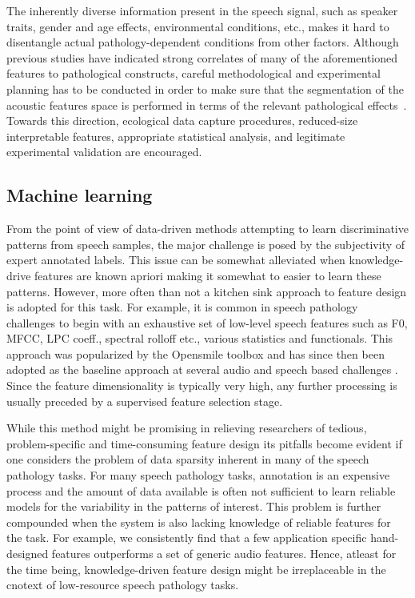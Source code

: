 \documentclass{article}
\begin{document}
The inherently diverse information present in the speech signal, such as speaker traits, gender and age effects, environmental conditions, etc., makes it hard to disentangle actual pathology-dependent conditions from other factors. Although previous studies have indicated strong correlates of many of the aforementioned features to pathological constructs, careful methodological and experimental planning has to be conducted in order to make sure that the segmentation of the acoustic features space is performed in terms of the relevant pathological effects~\cite{bone2013classifying}. Towards this direction, ecological data capture procedures, reduced-size interpretable features, appropriate statistical analysis, and legitimate experimental validation are encouraged.

\subsection{Machine learning}
From the point of view of data-driven methods attempting to learn discriminative patterns from speech samples, the major challenge is posed by the subjectivity of expert annotated labels. This issue can be somewhat alleviated when knowledge-drive features are known apriori making it somewhat to easier to learn these patterns. However, more often than not a kitchen sink approach to feature design is adopted for this task. For example, it is common in speech pathology challenges to begin with an exhaustive set of low-level speech features such as F0, MFCC, LPC coeff., spectral rolloff etc., various statistics and functionals. This approach was popularized by the Opensmile toolbox \cite{eyben2010themunich} and has since then been adopted as the baseline approach at several audio and speech based challenges \cite{}. Since the feature dimensionality is typically very high, any further processing is usually preceded by a supervised feature selection stage.

While this method might be promising in relieving researchers of tedious, problem-specific and time-consuming feature design its pitfalls become evident if one considers the problem of data sparsity inherent in many of the speech pathology tasks. For many speech pathology tasks, annotation is an expensive process and the amount of data available is often not sufficient to learn reliable models for the variability in the patterns of interest. This problem is further compounded when the system is also lacking knowledge of reliable features for the task. For example, we consistently find that a few application specific hand-designed features outperforms a set of generic audio features\cite{}. Hence, atleast for the time being, knowledge-driven feature design might be irreplaceable  in the cnotext of low-resource speech pathology tasks.
\end{document}
